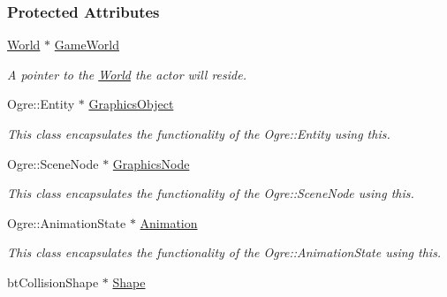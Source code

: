 \subsubsection*{Protected Attributes}
\begin{DoxyCompactItemize}
\item 
\hypertarget{classphys_1_1ActorBase_a0ffbb74296ac96db26c890274df794a2}{
\hyperlink{classphys_1_1World}{World} $\ast$ \hyperlink{classphys_1_1ActorBase_a0ffbb74296ac96db26c890274df794a2}{GameWorld}}
\label{d8/d0f/classphys_1_1ActorBase_a0ffbb74296ac96db26c890274df794a2}

\begin{DoxyCompactList}\small\item\em A pointer to the \hyperlink{classphys_1_1World}{World} the actor will reside. \item\end{DoxyCompactList}\item 
\hypertarget{classphys_1_1ActorBase_a25f3811fa1b2206dbabfaa2d6eb97784}{
Ogre::Entity $\ast$ \hyperlink{classphys_1_1ActorBase_a25f3811fa1b2206dbabfaa2d6eb97784}{GraphicsObject}}
\label{d8/d0f/classphys_1_1ActorBase_a25f3811fa1b2206dbabfaa2d6eb97784}

\begin{DoxyCompactList}\small\item\em This class encapsulates the functionality of the Ogre::Entity using this. \item\end{DoxyCompactList}\item 
\hypertarget{classphys_1_1ActorBase_a7262c31023ff41a027206e47befc7417}{
Ogre::SceneNode $\ast$ \hyperlink{classphys_1_1ActorBase_a7262c31023ff41a027206e47befc7417}{GraphicsNode}}
\label{d8/d0f/classphys_1_1ActorBase_a7262c31023ff41a027206e47befc7417}

\begin{DoxyCompactList}\small\item\em This class encapsulates the functionality of the Ogre::SceneNode using this. \item\end{DoxyCompactList}\item 
\hypertarget{classphys_1_1ActorBase_aed2853b0a97e12aa73f6167aa572e5f3}{
Ogre::AnimationState $\ast$ \hyperlink{classphys_1_1ActorBase_aed2853b0a97e12aa73f6167aa572e5f3}{Animation}}
\label{d8/d0f/classphys_1_1ActorBase_aed2853b0a97e12aa73f6167aa572e5f3}

\begin{DoxyCompactList}\small\item\em This class encapsulates the functionality of the Ogre::AnimationState using this. \item\end{DoxyCompactList}\item 
\hypertarget{classphys_1_1ActorBase_a643613ce7abb4b6d4352bab036b7cf69}{
btCollisionShape $\ast$ \hyperlink{classphys_1_1ActorBase_a643613ce7abb4b6d4352bab036b7cf69}{Shape}}
\label{d8/d0f/classphys_1_1ActorBase_a643613ce7abb4b6d4352bab036b7cf69}


\end{DoxyCompactItemize}
